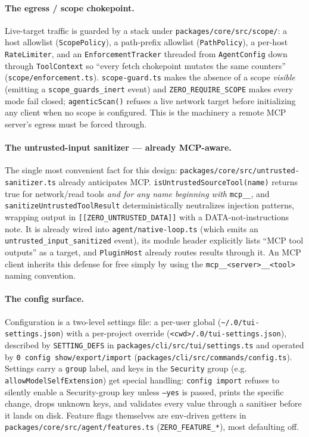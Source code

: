 \documentclass[11pt]{article}
\begin{document}
\paragraph{The egress / scope chokepoint.} Live-target traffic is guarded by a
stack under \texttt{packages/core/src/scope/}: a host allowlist
(\texttt{ScopePolicy}), a path-prefix allowlist (\texttt{PathPolicy}), a per-host
\texttt{RateLimiter}, and an \texttt{EnforcementTracker} threaded from
\texttt{AgentConfig} down through \texttt{ToolContext} so ``every fetch
chokepoint mutates the same counters''
(\texttt{scope/enforcement.ts}). \texttt{scope-guard.ts} makes the absence of a
scope \emph{visible} (emitting a \texttt{scope\_guards\_inert} event) and
\texttt{ZERO\_REQUIRE\_SCOPE} makes every mode fail closed;
\texttt{agenticScan()} refuses a live network target before initializing any
client when no scope is configured. This is the machinery a remote MCP server's
egress must be forced through.

\paragraph{The untrusted-input sanitizer --- already MCP-aware.} The single most
convenient fact for this design: \texttt{packages/core/src/untrusted-sanitizer.ts}
already anticipates MCP. \texttt{isUntrustedSourceTool(name)} returns true for
network/read tools \emph{and for any name beginning with} \texttt{mcp\_\_}, and
\texttt{sanitizeUntrustedToolResult} deterministically neutralizes injection
patterns, wrapping output in \texttt{[[ZERO\_UNTRUSTED\_DATA]]} with a
DATA-not-instructions note. It is already wired into
\texttt{agent/native-loop.ts} (which emits an \texttt{untrusted\_input\_sanitized}
event), its module header explicitly lists ``MCP tool outputs'' as a target, and
\texttt{PluginHost} already routes results through it. An MCP client inherits this
defense for free simply by using the \texttt{mcp\_\_<server>\_\_<tool>} naming
convention.

\paragraph{The config surface.} Configuration is a two-level settings file: a
per-user global (\texttt{\textasciitilde/.0/tui-settings.json}) with a
per-project override (\texttt{<cwd>/.0/tui-settings.json}), described by
\texttt{SETTING\_DEFS} in \texttt{packages/cli/src/tui/settings.ts} and operated
by \texttt{0 config show/export/import}
(\texttt{packages/cli/src/commands/config.ts}). Settings carry a \texttt{group}
label, and keys in the \texttt{Security} group (e.g.
\texttt{allowModelSelfExtension}) get special handling: \texttt{config import}
refuses to silently enable a Security-group key unless \texttt{--yes} is passed,
prints the specific change, drops unknown keys, and validates every value
through a sanitiser before it lands on disk. Feature flags themselves are
env-driven getters in \texttt{packages/core/src/agent/features.ts}
(\texttt{ZERO\_FEATURE\_*}), most defaulting off.
\end{document}
